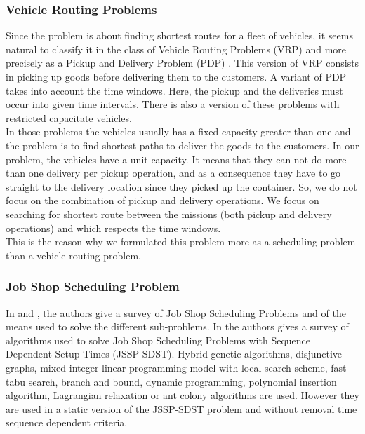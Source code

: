 \documentclass[a4paper,10pt]{article}
\begin{document}
	\subsubsection{Vehicle Routing Problems}
Since the problem is about finding shortest routes for a fleet of vehicles, it seems natural to classify it in the class of Vehicle Routing Problems (VRP)\cite{Toth2001,Laporte1992} and more precisely as a Pickup and Delivery Problem (PDP) \cite{Berbeglia2007}. This version of VRP consists in picking up goods before delivering them to the customers. A variant of PDP takes into account the time windows\cite{Mitrovic1998}. Here, the pickup and the deliveries must occur into given time intervals. There is also a version of these problems with restricted capacitate vehicles\cite{Toth2001}.\\

In those problems the vehicles usually has a fixed capacity greater than one and the problem is to find shortest paths to deliver the goods to the customers. In our problem, the vehicles have a unit capacity. It means that they can not do more than one delivery per pickup operation, and as a consequence they have to go straight to the delivery location since they picked up the container. So, we do not focus on the combination of pickup and delivery operations. We focus on searching for shortest route between the missions (both pickup and delivery operations) and which respects the time windows.\\

This is the reason why we formulated this problem more as a scheduling problem than a vehicle routing problem.

	\subsubsection{Job Shop Scheduling Problem}
In \cite{Jain1999} and \cite{Brucker2010}, the authors give a survey of Job Shop Scheduling Problems and of the means used to solve the different sub-problems.   In \cite{Allahverdi2008} the authors gives a survey of algorithms used to solve Job Shop Scheduling Problems with Sequence Dependent Setup Times (JSSP-SDST). Hybrid genetic algorithms, disjunctive graphs, mixed integer linear programming model with local search scheme, fast tabu search, branch and bound, dynamic programming, polynomial insertion algorithm, Lagrangian relaxation or ant colony algorithms are used. However they are used in a static version of the JSSP-SDST problem and without removal time sequence dependent criteria.\\
\end{document}
